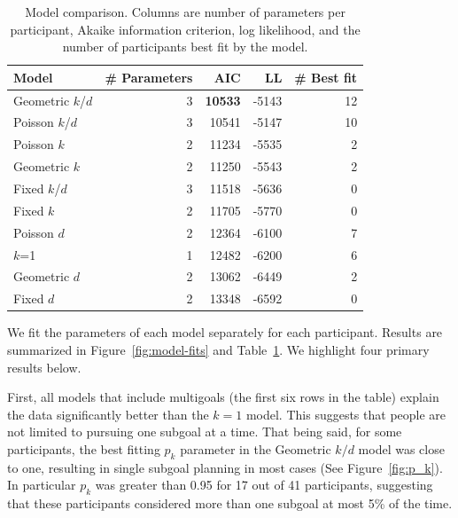 \documentclass[10pt,letterpaper]{article}
\begin{document}
\begin{table}[t!]
  \centering
  \begin{tabular}{lrrrr}
  \toprule
  Model         & \# Parameters & AIC   & LL    & \# Best fit \\
  \midrule
  Geometric $k$/$d$ & 3 & \textbf{10533} & -5143 & 12 \\
  Poisson $k$/$d$ & 3 & 10541 & -5147 & 10 \\
  Poisson $k$ & 2 & 11234 & -5535 & 2 \\
  Geometric $k$ & 2 & 11250 & -5543 & 2 \\
  Fixed $k$/$d$ & 3 & 11518 & -5636 & 0 \\
  Fixed $k$ & 2 & 11705 & -5770 & 0 \\
  Poisson $d$ & 2 & 12364 & -6100 & 7 \\
  $k$=1 & 1 & 12482 & -6200 & 6 \\
  Geometric $d$ & 2 & 13062 & -6449 & 2 \\
  Fixed $d$ & 2 & 13348 & -6592 & 0 \\
  \bottomrule
  \end{tabular}
  \caption{Model comparison. Columns are number of parameters per participant, Akaike information criterion, log likelihood, and the number of participants best fit by the model.}
  \label{tab:model-fits}
\end{table}

We fit the parameters of each model separately for each participant. Results are summarized in Figure~\ref{fig:model-fits} and Table~\ref{tab:model-fits}. We highlight four primary results below.

First, all models that include multigoals (the first six rows in the table) explain the data significantly better than the $k=1$ model. This suggests that people are not limited to pursuing one subgoal at a time. That being said, for some participants, the best fitting $p_k$ parameter in the Geometric $k/d$ model was close to one, resulting in single subgoal planning in most cases (See Figure~\ref{fig:p_k}). In particular $p_k$ was greater than 0.95 for 17 out of 41 participants, suggesting that these participants considered more than one subgoal at most 5\% of the time.

\end{document}
